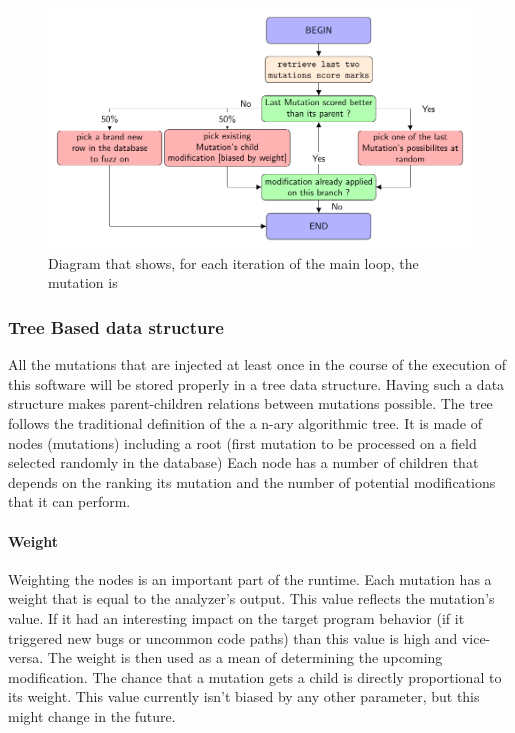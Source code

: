 \documentclass{article}
\begin{document}
\begin{empfile}
				\bigskip
			\begin{figure}[ht!]
			\includegraphics[width=\textwidth]{pickingPaternDiagram.pdf}
			\caption{Diagram that shows, for each iteration of the main loop, the mutation is }
			\end{figure}			
		
						\bigskip
			\subsubsection{Tree Based data structure}
All the mutations that are injected at least once in the course of the execution of this software will be stored properly in a tree data structure. Having such a data structure makes parent-children relations between mutations possible. The tree follows the traditional definition of the a n-ary algorithmic tree.
It is made of nodes (mutations) including a root (first mutation to be processed on a field selected randomly in the database)  
Each node has a number of children that depends on the ranking its mutation and the number of potential modifications that it can perform.
				\paragraph{Weight}
Weighting the nodes is an important part of the runtime. Each mutation has a weight that is equal to the analyzer's output. This value reflects the mutation's value. If it had an interesting impact on the target program behavior (if it triggered new bugs or uncommon code paths) than this value is high and vice-versa. The weight is then used as a mean of determining the upcoming modification. The chance that a mutation gets a child is directly proportional to its weight.
This value currently isn't biased by any other parameter, but this might change in the future.  

\end{empfile}
\end{document}
